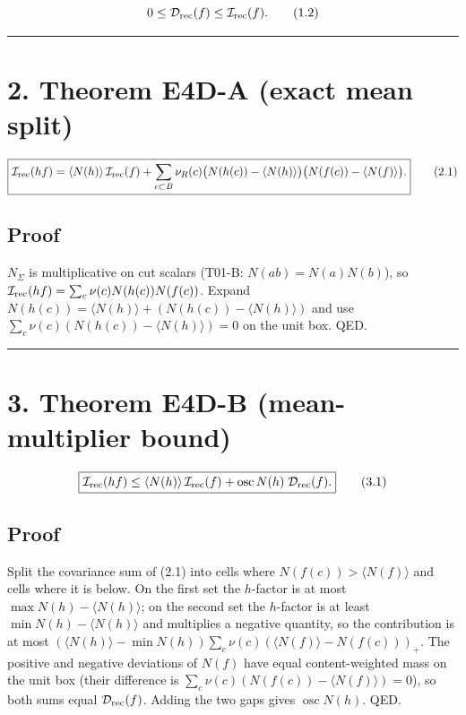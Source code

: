 \[
0\le\mathcal D_{\rm rec}(f)\le\mathcal I_{\rm rec}(f).
\tag{1.2}
\]

\begin{center}\rule{0.5\linewidth}{0.5pt}\end{center}

\hypertarget{theorem-e4d-a-exact-mean-split}{%
\section{2. Theorem E4D-A (exact mean split)}\label{theorem-e4d-a-exact-mean-split}}

\[
\boxed{
\mathcal I_{\rm rec}(hf)
=
\langle N(h)\rangle\,\mathcal I_{\rm rec}(f)
+
\sum_{c\subset B}\nu_R(c)
\bigl(N(h(c))-\langle N(h)\rangle\bigr)
\bigl(N(f(c))-\langle N(f)\rangle\bigr).
}
\tag{2.1}
\]

\hypertarget{proof}{%
\subsection{Proof}\label{proof}}

\(N_\Sigma\) is multiplicative on cut scalars (T01-B: \(N(ab)=N(a)N(b)\)), so
\(\mathcal I_{\rm rec}(hf)=\sum_c\nu(c)N(h(c))N(f(c))\). Expand
\(N(h(c))=\langle N(h)\rangle+(N(h(c))-\langle N(h)\rangle)\) and use
\(\sum_c\nu(c)(N(h(c))-\langle N(h)\rangle)=0\) on the unit box. QED.

\begin{center}\rule{0.5\linewidth}{0.5pt}\end{center}

\hypertarget{theorem-e4d-b-mean-multiplier-bound}{%
\section{3. Theorem E4D-B (mean-multiplier bound)}\label{theorem-e4d-b-mean-multiplier-bound}}

\[
\boxed{
\mathcal I_{\rm rec}(hf)
\le
\langle N(h)\rangle\,\mathcal I_{\rm rec}(f)
+
\operatorname{osc}N(h)\;\mathcal D_{\rm rec}(f).
}
\tag{3.1}
\]

\hypertarget{proof-1}{%
\subsection{Proof}\label{proof-1}}

Split the covariance sum of (2.1) into cells where
\(N(f(c))>\langle N(f)\rangle\) and cells where it is below. On the first set
the \(h\)-factor is at most \(\max N(h)-\langle N(h)\rangle\); on the second set
the \(h\)-factor is at least \(\min N(h)-\langle N(h)\rangle\) and multiplies a
negative quantity, so the contribution is at most
\((\langle N(h)\rangle-\min N(h))\sum_c\nu(c)(\langle N(f)\rangle-N(f(c)))_+\).
The positive and negative deviations of \(N(f)\) have equal content-weighted
mass on the unit box (their difference is \(\sum_c\nu(c)(N(f(c))-\langle N(f)\rangle)=0\)), so both sums equal \(\mathcal D_{\rm rec}(f)\). Adding the
two gaps gives \(\operatorname{osc}N(h)\). QED.

